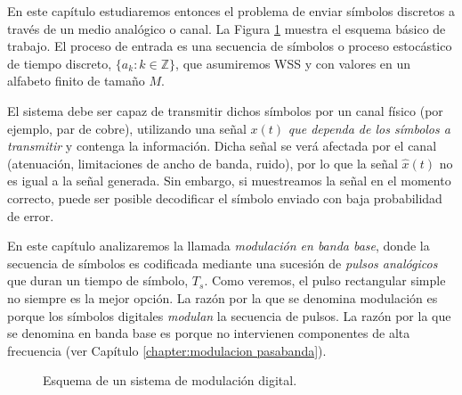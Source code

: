En este capítulo estudiaremos entonces el problema de enviar símbolos discretos a través de un medio analógico o canal. La Figura \ref{fig:mod_digital_bb} muestra el esquema básico de trabajo. El proceso de entrada es una secuencia de símbolos o proceso estocástico de tiempo discreto, $\{a_k:k\in\mathbb{Z}\}$, que asumiremos WSS y con valores en un alfabeto finito de tamaño $M$.

El sistema debe ser capaz de transmitir dichos símbolos por un canal físico (por ejemplo, par de cobre), utilizando una señal $x(t)$ \emph{que dependa de los símbolos a transmitir} y contenga la información. Dicha señal se verá afectada por el canal (atenuación, limitaciones de ancho de banda, ruido), por lo que la señal $\hat{x}(t)$ no es igual a la señal generada. Sin embargo, si muestreamos la señal en el momento correcto, puede ser posible decodificar el símbolo enviado con baja probabilidad de error.

En este capítulo analizaremos la llamada \emph{modulación en banda base}, donde la secuencia de símbolos es codificada mediante una sucesión de \emph{pulsos analógicos} que duran un tiempo de símbolo, $T_s$. Como veremos, el pulso rectangular simple no siempre es la mejor opción. La razón por la que se denomina modulación es porque los símbolos digitales \emph{modulan} la secuencia de pulsos. La razón por la que se denomina en banda base es porque no intervienen componentes de alta frecuencia (ver Capítulo \ref{chapter:modulacion pasabanda}).

\begin{figure}[b]
    \begin{center}
        

        \caption{Esquema de un sistema de modulación digital.}\label{fig:mod_digital_bb}
    \end{center}
\end{figure}

